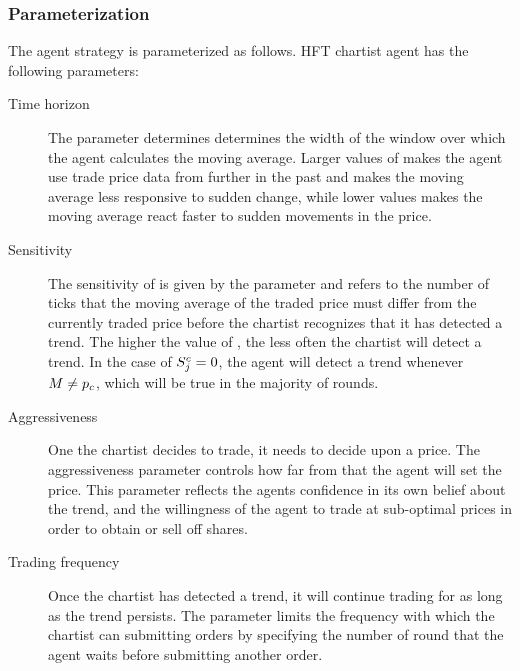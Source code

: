 \subsubsection{Parameterization}
The agent strategy is parameterized as follows. HFT chartist agent  has the following parameters:
\begin{description}
\item[Time horizon] The parameter  determines determines the width of the window over which the agent calculates the moving average. Larger values of  makes the agent use trade price data from further in the past and makes the moving average less responsive to sudden change, while lower values makes the moving average react faster to sudden movements in the price. 
\item[Sensitivity] The sensitivity of  is given by the parameter  and refers to the number of ticks that the moving average of the traded price must differ from the currently traded price before the chartist recognizes that it has detected a trend. The higher the value of , the less often the chartist will detect a trend. In the case of $S^c_{j} = 0$, the agent will detect a trend whenever $M \neq p_c$, which will be true in the majority of rounds.
\item[Aggressiveness] One the chartist decides to trade, it needs to decide upon a price. The aggressiveness parameter  controls how far from \currentprice that the agent will set the price. This parameter reflects the agents confidence in its own belief about the trend, and the willingness of the agent to trade at sub-optimal prices in order to obtain or sell off shares.
\item[Trading frequency] Once the chartist has detected a trend, it will continue trading for as long as the trend persists. The parameter  limits the frequency with which the chartist can submitting orders by specifying the number of round that the agent waits before submitting another order.
\end{description}

